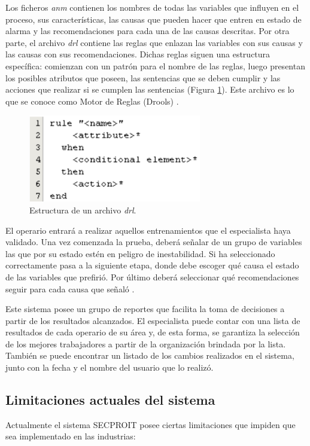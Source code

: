 Los ficheros \textsl{anm} contienen los nombres de todas las variables que influyen en el proceso, sus características, las causas que pueden hacer que entren en estado de alarma y las recomendaciones para cada una de las causas descritas. Por otra parte, el archivo \textsl{drl} contiene las reglas que enlazan las variables con sus causas y las causas con sus recomendaciones. Dichas reglas siguen una estructura específica: comienzan con un patrón para el nombre de las reglas, luego presentan los posibles atributos que poseen, las sentencias que se deben cumplir y las acciones que realizar si se cumplen las sentencias (Figura \ref{fig:drools}). Este archivo es lo que se conoce como Motor de Reglas (Drools) \cite{BaseConocimiento}.

\begin{figure}[h]
\centering
 \includegraphics[width=0.5\linewidth]{imagen/EstructuraDRL.png}
 \caption{Estructura de un archivo \textsl{drl}.}
 \label{fig:drools} 
\end{figure}

El operario entrará a realizar aquellos entrenamientos que el especialista haya validado. Una vez comenzada la prueba, deberá señalar de un grupo de variables las que por su estado estén en peligro de inestabilidad. Si ha seleccionado correctamente pasa a la siguiente etapa, donde debe escoger qué causa el estado de las variables que prefirió. Por último deberá seleccionar qué recomendaciones seguir para cada causa que señaló \cite{SECPROIT}.

Este sistema posee un grupo de reportes que facilita la toma de decisiones a partir de los resultados alcanzados. El especialista puede contar con una lista de resultados de cada operario de su área y, de esta forma, se garantiza la selección de los mejores trabajadores a partir de la organización brindada por la lista. También se puede encontrar un listado de los cambios realizados en el sistema, junto con la fecha y el nombre del usuario que lo realizó.

\subsection{Limitaciones actuales del sistema}
Actualmente el sistema SECPROIT posee ciertas limitaciones que impiden que sea implementado en las industrias:


